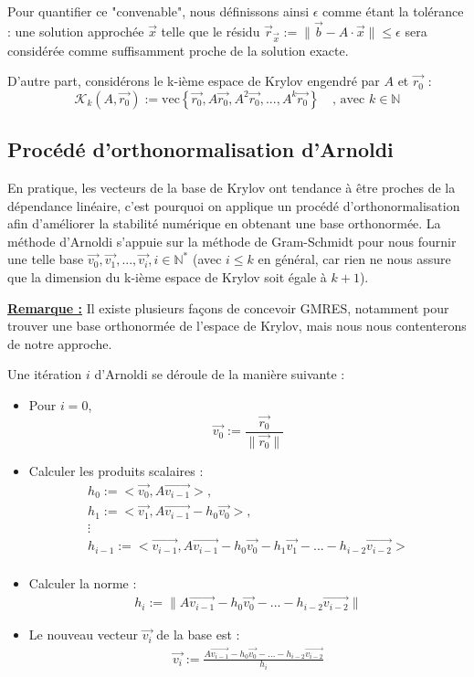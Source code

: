 \documentclass[11pt,a4paper,oneside]{memoir}
\newcommand{\N}{\mathbb{N}}	\newcommand{\Z}{\mathbb{Z}}
\theoremstyle{definition}
\theoremstyle{remark}
\theoremstyle{plain}
\begin{document}
Pour quantifier ce "convenable", nous définissons ainsi $\epsilon$ comme étant la tolérance : une solution approchée $\vec{x}$ telle que le résidu $ \vec{r}_{\vec{x}} := \lVert \vec{b} - A \cdot \vec{x} \rVert \leq \epsilon$ sera considérée comme suffisamment proche de la solution exacte.\medskip

D'autre part, considérons le k-ième espace de Krylov engendré par $A$ et $\vec{r_0}$ :
\[
\mathcal{K}_k (A,\vec{r_0}) := \text{vec}\left\{ \vec{r_0}, A\vec{r_0}, A^2 \vec{r_0}, ..., A^k \vec{r_0} \right\} \quad\text{, avec } k \in \N
\]

\subsection{Procédé d'orthonormalisation d'Arnoldi}

En pratique, les vecteurs de la base de Krylov ont tendance à être proches de la dépendance linéaire, c'est pourquoi on applique un procédé d'orthonormalisation afin d'améliorer la stabilité numérique en obtenant une base orthonormée. La méthode d'Arnoldi s'appuie sur la méthode de Gram-Schmidt pour nous fournir une telle base $\vec{v_0}, \vec{v_1}, ..., \vec{v_i}, i \in \N^*$ (avec $i \leq k$ en général, car rien ne nous assure que la dimension du k-ième espace de Krylov soit égale à $k+1$).\medskip

\underline{\textbf{Remarque :}} Il existe plusieurs façons de concevoir GMRES, notamment pour trouver une base orthonormée de l'espace de Krylov, mais nous nous contenterons de notre approche.\medskip

Une itération $i$ d'Arnoldi se déroule de la manière suivante :
\begin{itemize}
\item Pour $i=0$,
\[
\vec{v_0} := \frac{\vec{r_0}}{\lVert \vec{r_0} \rVert}
\]
\item Calculer les produits scalaires :
\[
\begin{array}{l}
h_0 := <\vec{v_0},A\vec{v_{i-1}}>, \\
h_1 := <\vec{v_1},A\vec{v_{i-1}} - h_0\vec{v_0}>, \\
\vdots \\
h_{i-1} := <\vec{v_{i-1}},A\vec{v_{i-1}} - h_0\vec{v_0} - h_1 \vec{v_1} - ... - h_{i-2} \vec{v_{i-2}}> \\
\end{array}
\]
\item Calculer la norme :
\[
\begin{array}{l}
h_i := \lVert A\vec{v_{i-1}} - h_0 \vec{v_0} - ... - h_{i-2} \vec{v_{i-2}} \rVert
\end{array}
\]
\item Le nouveau vecteur $\vec{v_i}$ de la base est :
\[
\begin{array}{l}
\vec{v_i} := \frac{A\vec{v_{i-1}} - h_0 \vec{v_0} - ... - h_{i-2} \vec{v_{i-2}}}{h_i}
\end{array}
\]
\end{itemize}
\end{document}
